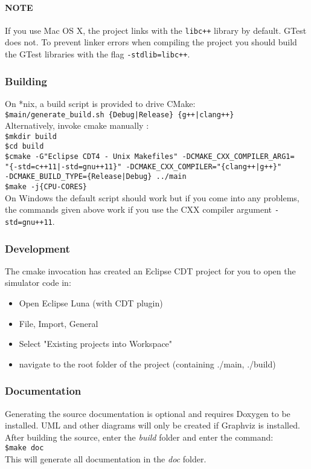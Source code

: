 \paragraph{NOTE} If you use Mac OS X, the project links with the \texttt{libc++} library by default. GTest does not. To prevent linker errors when compiling the project you should build the GTest libraries with the flag \texttt{-stdlib=libc++}.
\subsubsection{Building}
On *nix, a build script is provided to drive CMake:\\
\texttt{\$main/generate\_build.sh \{Debug|Release\} \{g++|clang++\} }\\
Alternatively, invoke cmake manually : \\
\texttt{\$mkdir build }\\
\texttt{\$cd build}\\
\texttt{\$cmake -G"Eclipse CDT4 - Unix Makefiles" -DCMAKE\_CXX\_COMPILER\_ARG1=\\"\{-std=c++11|-std=gnu++11\}" -DCMAKE\_CXX\_COMPILER="\{clang++|g++\}" \\-DCMAKE\_BUILD\_TYPE=\{Release|Debug\} ../main}\\
\texttt{\$make -j\{CPU-CORES\}}\\

On Windows the default script should work but if you come into any problems, the commands given above work if you use the CXX compiler argument \texttt{-std=gnu++11}.
\subsubsection{Development}
The cmake invocation has created an Eclipse CDT project for you to open the simulator code in:
\begin{itemize}
  \item Open Eclipse Luna (with CDT plugin)
  \item File, Import, General
  \item Select "Existing projects into Workspace"
  \item navigate to the root folder of the project (containing ./main, ./build)
\end{itemize}

\subsubsection{Documentation}
Generating the source documentation is optional and requires Doxygen to be installed. UML and other diagrams will only be created if Graphviz is installed.\\
After building the source, enter the \textsl{build} folder and enter the command:\\
\texttt{\$make doc}\\This will generate all documentation in the \textsl{doc} folder.